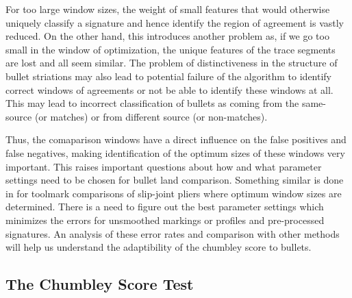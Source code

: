 \documentclass[12pt]{article}
\begin{document}
For too large window sizes, the weight of small features that would
otherwise uniquely classify a signature and hence identify the region of
agreement is vastly reduced. On the other hand, this introduces another
problem as, if we go too small in the window of optimization, the unique
features of the trace segments are lost and all seem similar. The
problem of distinctiveness in the structure of bullet striations may
also lead to potential failure of the algorithm to identify correct
windows of agreements or not be able to identify these windows at all.
This may lead to incorrect classification of bullets as coming from the
same-source (or matches) or from different source (or non-matches).

Thus, the comaparison windows have a direct influence on the false
positives and false negatives, making identification of the optimum
sizes of these windows very important. This raises important questions
about how and what parameter settings need to be chosen for bullet land
comparison. Something similar is done in \citet{afte-chumbley} for
toolmark comparisons of slip-joint pliers where optimum window sizes are
determined. There is a need to figure out the best parameter settings
which minimizes the errors for unsmoothed markings or profiles and
pre-processed signatures. An analysis of these error rates and
comparison with other methods will help us understand the adaptibility
of the chumbley score to bullets.

\subsection{The Chumbley Score Test}\label{the-chumbley-score-test}
\end{document}
